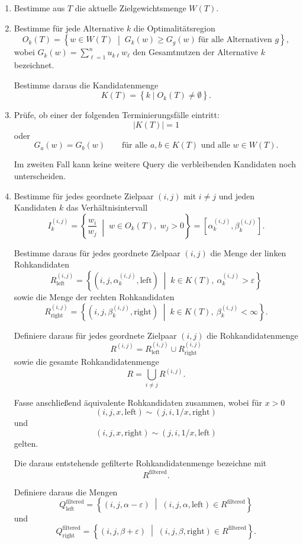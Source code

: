 \documentclass{article}
\begin{document}
\begin{enumerate}
\item
Bestimme aus \(T\) die aktuelle Zielgewichtsmenge \(W(T)\).

\item
Bestimme f\"ur jede Alternative \(k\) die Optimalit\"atsregion
\[
O_k(T)
=
\left\{
w\in W(T)\;\middle|\;
G_k(w)\ge G_g(w)\ \text{f\"ur alle Alternativen } g
\right\},
\]
wobei \(G_k(w)=\sum_{\ell=1}^n u_{k\ell}w_\ell\) den Gesamtnutzen der Alternative \(k\) bezeichnet.


Bestimme daraus die Kandidatenmenge
\[
K(T)=\left\{k\mid O_k(T)\neq\emptyset\right\}.
\]

\item
Pr\"ufe, ob einer der folgenden Terminierungsf\"alle eintritt:
\[
|K(T)|=1
\]
oder
\[
G_a(w)=G_b(w)\qquad\text{f\"ur alle }a,b\in K(T)\text{ und alle }w\in W(T).
\]

Im zweiten Fall kann keine weitere Query die verbleibenden Kandidaten noch
unterscheiden.

\item
Bestimme f\"ur jedes geordnete Zielpaar \((i,j)\) mit \(i\neq j\) und jeden
Kandidaten \(k\) das Verh\"altnisintervall
\[
I_k^{(i,j)}
=
\left\{
\frac{w_i}{w_j}
\;\middle|\;
w\in O_k(T),\; w_j>0
\right\}
=
[\alpha_k^{(i,j)},\beta_k^{(i,j)}].
\]

Bestimme daraus f\"ur jedes geordnete Zielpaar \((i,j)\) die Menge der linken
Rohkandidaten
\[
R_{\mathrm{left}}^{(i,j)}
=
\left\{
(i,j,\alpha_k^{(i,j)},\mathrm{left})
\;\middle|\;
k\in K(T),\ \alpha_k^{(i,j)} > \varepsilon
\right\}
\]
sowie die Menge der rechten Rohkandidaten
\[
R_{\mathrm{right}}^{(i,j)}
=
\left\{
(i,j,\beta_k^{(i,j)},\mathrm{right})
\;\middle|\;
k\in K(T),\ \beta_k^{(i,j)} < \infty
\right\}.
\]

Definiere daraus f\"ur jedes geordnete Zielpaar \((i,j)\) die
Rohkandidatenmenge
\[
R^{(i,j)}
=
R_{\mathrm{left}}^{(i,j)}
\cup
R_{\mathrm{right}}^{(i,j)}
\]
sowie die gesamte Rohkandidatenmenge
\[
R
=
\bigcup_{i\neq j} R^{(i,j)}.
\]

Fasse anschlie\ss end \"aquivalente Rohkandidaten zusammen, wobei f\"ur \(x>0\)
\[
(i,j,x,\mathrm{left}) \sim (j,i,1/x,\mathrm{right})
\]
und
\[
(i,j,x,\mathrm{right}) \sim (j,i,1/x,\mathrm{left})
\]
gelten.



Die daraus entstehende gefilterte Rohkandidatenmenge bezeichne mit
\[
R^{\mathrm{filtered}}.
\]

Definiere daraus die Mengen
\[
Q_{\mathrm{left}}^{\mathrm{filtered}}
=
\left\{
(i,j,\alpha-\varepsilon)
\;\middle|\;
(i,j,\alpha,\mathrm{left})\in R^{\mathrm{filtered}}
\right\}
\]
und
\[
Q_{\mathrm{right}}^{\mathrm{filtered}}
=
\left\{
(i,j,\beta+\varepsilon)
\;\middle|\;
(i,j,\beta,\mathrm{right})\in R^{\mathrm{filtered}}
\right\}.
\]


\end{enumerate}
\end{document}
